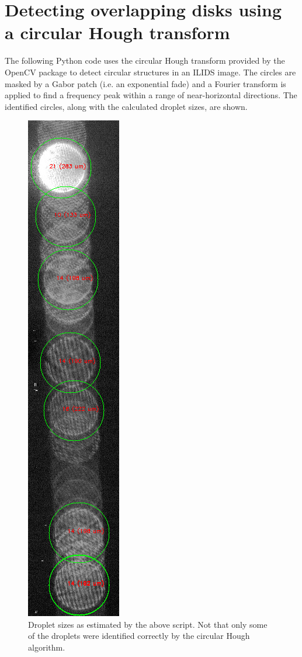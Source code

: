 \documentclass[11.5pt,oneside]{book}
\begin{document}
\section*{Detecting overlapping disks using\\a circular Hough transform}
The following Python code uses the circular Hough transform provided by the
OpenCV package to detect circular structures in an ILIDS image. The circles are
masked by a Gabor patch (i.e. an exponential fade) and a Fourier transform is
applied to find a frequency peak within a range of near-horizontal directions.
The identified circles, along with the calculated droplet sizes, are shown.

\begin{figure}
    \centering
    \includegraphics[height=0.9\textheight]{img/houghdrops.jpg}
    \caption{Droplet sizes as estimated by the above script. Not that only some
    of the droplets were identified correctly by the circular Hough algorithm.}
\end{figure}
\end{document}
